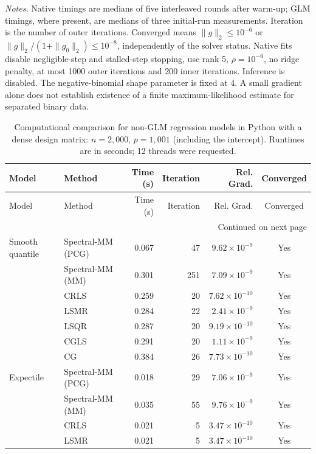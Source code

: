\documentclass[10pt,a4paper]{article}
\begin{document}
\noindent\textit{Notes.} Native timings are medians of five interleaved rounds after warm-up; GLM timings, where present, are medians of three initial-run measurements. Iteration is the number of outer iterations. Converged means $\|g\|_2\leq10^{-6}$ or $\|g\|_2/(1+\|g_0\|_2)\leq10^{-8}$, independently of the solver status. Native fits disable negligible-step and stalled-step stopping, use rank 5, $\rho=10^{-6}$, no ridge penalty, at most 1000 outer iterations and 200 inner iterations. Inference is disabled.
The negative-binomial shape parameter is fixed at 4. A small gradient alone does not establish existence of a finite maximum-likelihood estimate for separated binary data.
\par
\endgroup

\clearpage
\begingroup
\small
\setlength{\tabcolsep}{5pt}
\begin{longtable}{llrrrc}
\caption{Computational comparison for non-GLM regression models in Python with a dense design matrix: $n=2{,}000$, $p=1{,}001$ (including the intercept). Runtimes are in seconds; 12 threads were requested.}
\label{tab:python-dense-nonglm-strict}\\
\toprule
Model & Method & Time (s) & Iteration & Rel. Grad. & Converged \\
\midrule
\endfirsthead
\toprule
Model & Method & Time (s) & Iteration & Rel. Grad. & Converged \\
\midrule
\endhead
\midrule
\multicolumn{6}{r}{Continued on next page}\\
\endfoot
\bottomrule
\endlastfoot
Smooth quantile & Spectral-MM (PCG) & 0.067 & 47 & $9.62\times10^{-9}$ & Yes \\
 & Spectral-MM (MM) & 0.301 & 251 & $7.09\times10^{-9}$ & Yes \\
 & CRLS & 0.259 & 20 & $7.62\times10^{-10}$ & Yes \\
 & LSMR & 0.284 & 22 & $2.41\times10^{-9}$ & Yes \\
 & LSQR & 0.287 & 20 & $9.19\times10^{-10}$ & Yes \\
 & CGLS & 0.291 & 20 & $1.11\times10^{-9}$ & Yes \\
 & CG & 0.384 & 26 & $7.73\times10^{-10}$ & Yes \\
\midrule
Expectile & Spectral-MM (PCG) & 0.018 & 29 & $7.06\times10^{-9}$ & Yes \\
 & Spectral-MM (MM) & 0.035 & 55 & $9.76\times10^{-9}$ & Yes \\
 & CRLS & 0.021 & 5 & $3.47\times10^{-10}$ & Yes \\
 & LSMR & 0.021 & 5 & $3.47\times10^{-10}$ & Yes \\

\end{longtable}
\end{document}
